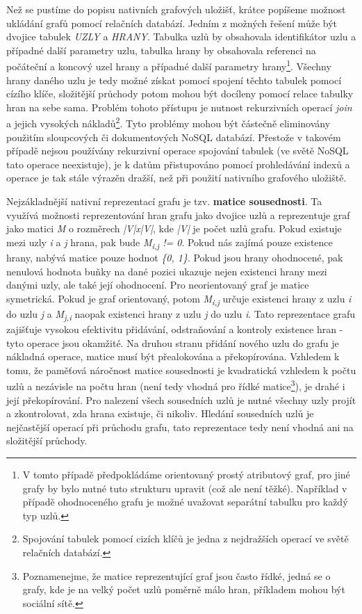 Než se pustíme do popisu nativních grafových uložišť, krátce popíšeme možnost ukládání grafů pomocí relačních databází. Jedním z možných řešení může být dvojice tabulek \textit{UZLY} a \textit{HRANY}. Tabulka uzlů by obsahovala identifikátor uzlu a případné další parametry uzlu, tabulka hrany by obsahovala referenci na počáteční a koncový uzel hrany a případné další parametry hrany\footnote{V tomto případě předpokládáme orientovaný prostý atributový graf, pro jiné grafy by bylo nutné tuto strukturu upravit (což ale není těžké). Například v případě ohodnoceného grafu je možné uvažovat separátní tabulku pro každý typ uzlů.}. Všechny hrany daného uzlu je tedy možné získat pomocí spojení těchto tabulek pomocí cízího klíče, složitější průchody potom mohou být docíleny pomocí relace tabulky hran na sebe sama. Problém tohoto přístupu je nutnost rekurzivních operací \textit{join} a jejich vysokých nákladů\footnote{Spojování tabulek pomocí cizích klíčů je jedna z nejdražších operací ve světě relačních databází.}. Tyto problémy mohou být částečně eliminovány použitím sloupcových či dokumentových NoSQL databází. Přestože v takovém případě nejsou používány rekurzivní operace spojování tabulek (ve světě NoSQL tato operace neexistuje), je k datům přistupováno pomocí prohledávání indexů a operace je tak stále výrazěn dražší, než při použití nativního grafového uložiště.\cite{Lal15} 

Nejzákladnější nativní reprezentací grafu je tzv. \textbf{matice sousednosti}. Ta využívá možnosti reprezentování hran grafu jako dvojice uzlů a reprezentuje graf jako matici \textit{M} o rozměrech \textit{|V|x|V|}, kde \textit{|V|} je počet uzlů grafu. Pokud existuje mezi uzly \textit{i} a \textit{j} hrana, pak bude \textit{M\textsubscript{i,j} != 0}. 
Pokud nás zajímá pouze existence hrany, nabývá matice pouze hodnot \textit{\{0, 1\}}. Pokud jsou hrany ohodnocené, pak nenulová hodnota buňky na dané pozici ukazuje nejen existenci hrany mezi danými uzly, ale také její ohodnocení. Pro neorientovaný graf je matice symetrická. Pokud je graf orientovaný, potom \textit{M\textsubscript{i,j}} určuje existenci hrany z uzlu \textit{i} do uzlu \textit{j} a \textit{M\textsubscript{j,i}} naopak existenci hrany z uzlu \textit{j} do uzlu \textit{i}. 
Tato reprezentace grafu zajišťuje vysokou efektivitu přidávání, odstraňování a kontroly existence hran - tyto operace jsou okamžité.  Na druhou stranu přidání nového uzlu do grafu je nákladná operace, matice musí být přealokována a překopírována. Vzhledem k tomu, že paměťová náročnost matice sousednosti je kvadratická vzhledem k počtu uzlů a nezávisle na počtu hran (není tedy vhodná pro řídké matice\footnote{Poznamenejme, že matice reprezentující graf jsou často řídké, jedná se o grafy, kde je na velký počet uzlů poměrně málo hran, příkladem mohou být sociální sítě.}), je drahé i její překopírování. 
Pro nalezení všech sousedních uzlů je nutné všechny uzly projít a zkontrolovat, zda hrana existuje, či nikoliv. Hledání sousedních uzlů je nejčastější operací při průchodu grafu, tato reprezentace tedy není vhodná ani na složitější průchody.

